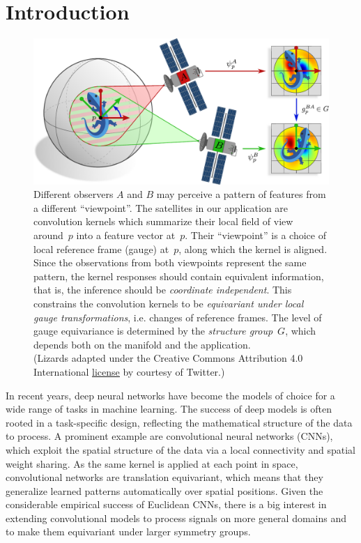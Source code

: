 

\section{Introduction}


\begin{figure}
    \centering
    \vspace*{-2ex}
    \includegraphics[width=.94\textwidth]{figures/satellite_kernels.pdf}
    \caption{\small
        Different observers $A$ and $B$ may perceive a pattern of features from a different ``viewpoint''.
        The satellites in our application are convolution kernels which summarize their local field of view around~$p$ into a feature vector at~$p$.
        Their ``viewpoint'' is a choice of local reference frame (gauge) at~$p$, along which the kernel is aligned.
        Since the observations from both viewpoints represent the same pattern, the kernel responses should contain equivalent information, that is, the inference should be \emph{coordinate independent}.
        This constrains the convolution kernels to be \emph{equivariant under local gauge transformations}, i.e. changes of reference frames.
        The level of gauge equivariance is determined by the \emph{structure group}~$G$, which depends both on the manifold and the application.
        {\\
        \color{gray}
        \scriptsize
            (Lizards adapted under the Creative Commons Attribution 4.0 International
            \href{https://github.com/twitter/twemoji/blob/gh-pages/LICENSE-GRAPHICS}{\underline{license}}
            by courtesy of Twitter.)
        }
    }
    \label{fig:satellite}
\end{figure}


In recent years, deep neural networks have become the models of choice for a wide range of tasks in machine learning.
The success of deep models is often rooted in a task-specific design, reflecting the mathematical structure of the data to process.
A prominent example are convolutional neural networks (CNNs), which exploit the spatial structure of the data via a local connectivity and spatial weight sharing.
As the same kernel is applied at each point in space, convolutional networks are translation equivariant, which means that they generalize learned patterns automatically over spatial positions.
Given the considerable empirical success of Euclidean CNNs, there is a big interest in extending convolutional models to process signals on more general domains and to make them equivariant under larger symmetry groups.


